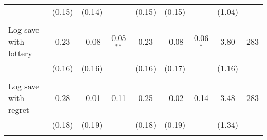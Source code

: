 \begin{table}[htbp]
{\begin{threeparttable}
\begin{tabular}{l*{8}{c}}
          &   (0.15)&   (0.14)&         &   (0.15)&   (0.15)&         &   (1.04)&         \\
          &         &         &         &         &         &         &         &         \\
Log save with lottery&     0.23&    -0.08&0.05$^{**}$&     0.23&    -0.08&0.06$^{*}$&     3.80&      283\\
          &   (0.16)&   (0.16)&         &   (0.16)&   (0.17)&         &   (1.16)&         \\
          &         &         &         &         &         &         &         &         \\
Log save with regret&     0.28&    -0.01&     0.11&     0.25&    -0.02&     0.14&     3.48&      283\\
          &   (0.18)&   (0.19)&         &   (0.18)&   (0.19)&         &   (1.34)&         \\
          &         &         &         &         &         &         &         &         \\
\bottomrule \end{tabular} \begin{tablenotes}[flushleft] \footnotesize \item  \end{tablenotes} \end{threeparttable} } \end{table}
